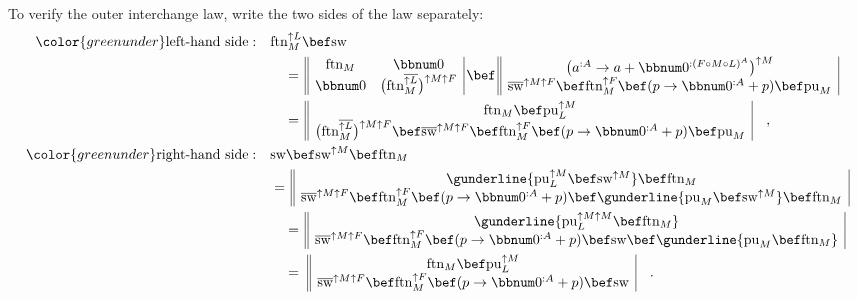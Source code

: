 To verify the outer interchange law, write the two sides of the law
separately:
\begin{align*}
{\color{greenunder}\text{left-hand side}:}\quad & \text{ftn}_{M}^{\uparrow L}\bef\text{sw}\\
 & \quad=\,\begin{array}{||cc|}
\text{ftn}_{M} & \bbnum 0\\
\bbnum 0 & \big(\text{ftn}_{M}^{\overline{\uparrow L}}\big)^{\uparrow M\uparrow F}
\end{array}\,\bef\,\begin{array}{||c|}
\big(a^{:A}\rightarrow a+\bbnum 0^{:(F\circ M\circ L)^{A}}\big)^{\uparrow M}\\
\overline{\text{sw}}^{\uparrow M\uparrow F}\bef\text{ftn}_{M}^{\uparrow F}\bef(p\rightarrow\bbnum 0^{:A}+p)\bef\text{pu}_{M}
\end{array}\\
 & \quad=\,\begin{array}{||c|}
\text{ftn}_{M}\bef\text{pu}_{L}^{\uparrow M}\\
\big(\text{ftn}_{M}^{\overline{\uparrow L}}\big)^{\uparrow M\uparrow F}\bef\overline{\text{sw}}^{\uparrow M\uparrow F}\bef\text{ftn}_{M}^{\uparrow F}\bef(p\rightarrow\bbnum 0^{:A}+p)\bef\text{pu}_{M}
\end{array}\quad,\\
{\color{greenunder}\text{right-hand side}:}\quad & \text{sw}\bef\text{sw}^{\uparrow M}\bef\text{ftn}_{M}\\
 & =\,\begin{array}{||c|}
\gunderline{\text{pu}_{L}^{\uparrow M}\bef\text{sw}^{\uparrow M}}\bef\text{ftn}_{M}\\
\overline{\text{sw}}^{\uparrow M\uparrow F}\bef\text{ftn}_{M}^{\uparrow F}\bef(p\rightarrow\bbnum 0^{:A}+p)\bef\gunderline{\text{pu}_{M}\bef\text{sw}^{\uparrow M}}\bef\text{ftn}_{M}
\end{array}\\
 & \quad=\,\begin{array}{||c|}
\gunderline{\text{pu}_{L}^{\uparrow M\uparrow M}\bef\text{ftn}_{M}}\\
\overline{\text{sw}}^{\uparrow M\uparrow F}\bef\text{ftn}_{M}^{\uparrow F}\bef(p\rightarrow\bbnum 0^{:A}+p)\bef\text{sw}\bef\gunderline{\text{pu}_{M}\bef\text{ftn}_{M}}
\end{array}\\
 & \quad=\,\,\begin{array}{||c|}
\text{ftn}_{M}\bef\text{pu}_{L}^{\uparrow M}\\
\overline{\text{sw}}^{\uparrow M\uparrow F}\bef\text{ftn}_{M}^{\uparrow F}\bef(p\rightarrow\bbnum 0^{:A}+p)\bef\text{sw}
\end{array}\quad.
\end{align*}
